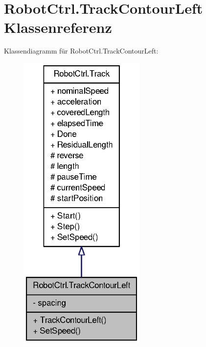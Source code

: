 \hypertarget{class_robot_ctrl_1_1_track_contour_left}{
\section{RobotCtrl.TrackContourLeft Klassenreferenz}
\label{class_robot_ctrl_1_1_track_contour_left}
}


Klassendiagramm für RobotCtrl.TrackContourLeft:\nopagebreak
\begin{figure}[H]
\begin{center}
\leavevmode
\includegraphics[width=178pt]{class_robot_ctrl_1_1_track_contour_left__inherit__graph}
\end{center}
\end{figure}


